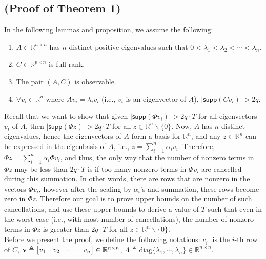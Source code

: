 \documentclass[twocolumn]{autart}    %
\begin{document}
\subsection*{(Proof of Theorem 1)}
\vspace{-0.4cm}
In the following lemmas and proposition, we assume the following:
\vspace{-0.4cm}
\begin{enumerate}
\item $A \in \mathbb{R}^{n\times n}$ has $n$ distinct positive eigenvalues such that $0 < \lambda_1 < \lambda_2 < \cdots < \lambda_n$.%
\item $C \in \mathbb{R}^{p \times n}$ is full rank. 
\item The pair $(A,C)$ is observable.
\item $\forall v_i \in \mathbb{R}^n$ where  $ Av_i = \lambda_i v_i $ (i.e., $v_i$ is an eigenvector of $A$), $ \lvert \textsf{supp}(Cv_i) \rvert > 2q$.
\end{enumerate}
\vspace{-0.4cm}                                
Recall that we want to show that given $\lvert \textsf{supp} (\Phi v_i) \rvert > 2q\cdot T $ for all eigenvectors $v_i$ of $A$, then $\lvert \textsf{supp} (\Phi z) \rvert > 2q\cdot T $ for all $z \in \mathbb{R}^n \backslash \{0\}$. Now, $A$ has $n$ distinct eigenvalues, hence the eigenvectors of $A$ form a basis for $\mathbb{R}^n$, and any $z \in \mathbb{R}^n$ can be expressed in the eigenbasis of $A$, i.e., $ z = \sum_{i=1}^n \alpha_i v_i$. Therefore, $\Phi z = \sum_{i=1}^n \alpha_i \Phi v_i$, and thus, the only way that the number of nonzero terms in $\Phi z$ may be less than $2q\cdot T$ is if too many nonzero terms in $\Phi v_i$ are cancelled during this summation. 
In other words, there are rows that are nonzero in the vectors $\Phi v_i$, however after the scaling by $\alpha_i$'s and summation, these rows become zero in $\Phi z$. Therefore our goal is to prove upper bounds on the number of such cancellations, and use these upper bounds to derive a value of $T$ such that even in the worst case (i.e., with most number of cancellations), the number of nonzero terms in $\Phi z$ is greater than $2q\cdot T$ for all $z \in \mathbb{R}^n \backslash \{0\}$.
\\
Before we present the proof, we define the following notations: $c_i^\top$ is the $i$-th row of $C$, ${\bf v} \triangleq \begin{bmatrix} v_1 & v_2 & \cdots & v_n \end{bmatrix} \in \mathbb{R}^{n \times n}$, $\Lambda \triangleq \text{diag}\{ \lambda_1, \cdots , \lambda_n \} \in \mathbb{R}^{n \times n}$. %
\end{document}
